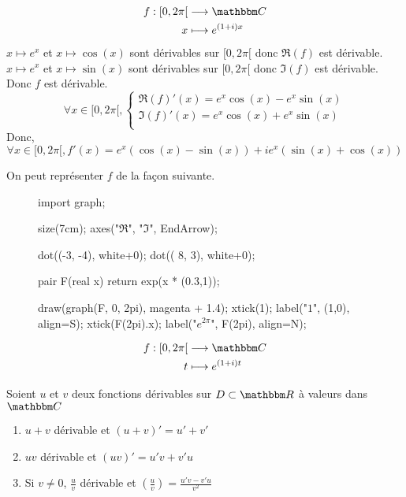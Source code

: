 \begin{exm}
	\begin{align*}
		f: [0,2\pi[ &\longrightarrow \C \\
		x &\longmapsto e^{(1+i)x}
	\end{align*}
	$x\mapsto e^x$ et $x\mapsto \cos(x)$ sont dérivables sur $[0,2\pi[$ donc $\Re(f)$ est dérivable.\\
	$x\mapsto e^x$ et $x\mapsto \sin(x)$ sont dérivables sur $[0,2\pi[$ donc $\Im(f)$ est dérivable.\\
	Donc $f$ est dérivable. \[
		\forall x \in [0,2\pi[,
		\begin{cases}
			\Re(f)'(x) = e^x\cos(x) - e^x\sin(x)\\
			\Im(f)'(x) = e^x\cos(x) + e^x\sin(x)\\
		\end{cases}
	\]  Donc, \[
		\forall x \in [0,2\pi[, f'(x) = e^x (\cos(x) - \sin(x)) +ie^x(\sin(x) + \cos(x))
	\] 
\end{exm}

\begin{rmk}
	On peut représenter $f$ de la façon suivante.\\
	\begin{minipage}
		{\linewidth}
		\begin{wrapfigure}
			{l}{0.75\textwidth}
			\centering
			\begin{asy}
				import graph;

				size(7cm);
				axes("$\Re$", "$\Im$", EndArrow);

				dot((-3, -4), white+0);
				dot(( 8,  3), white+0);

				pair F(real x) {return exp(x * (0.3,1)); }

				draw(graph(F, 0, 2pi), magenta + 1.4);
				xtick(1); label("$1$", (1,0), align=S);
				xtick(F(2pi).x); label("$e^{2\pi}$", F(2pi), align=N);
			\end{asy}
		\end{wrapfigure}
		\begin{align*}
			f: [0,2\pi[ &\longrightarrow \C \\
			t &\longmapsto e^{(1+i)t}
		\end{align*}
		\vspace{3cm}
	\end{minipage}
\end{rmk}

\begin{prop}
	Soient $u$ et $v$ deux fonctions dérivables sur $D\subset \R$ à valeurs dans $\C$ 
	\begin{enumerate}
		\item $u+v$ dérivable et $(u+v)' = u' + v'$ 
		\item $uv$ dérivable et $(uv)' = u'v + v'u$ 
		\item Si $v \neq 0$, $\frac{u}{v}$ dérivable et $\left( \frac{u}{v} \right) = \frac{u'v-v'u}{v^2}$
	\end{enumerate}
\end{prop}

